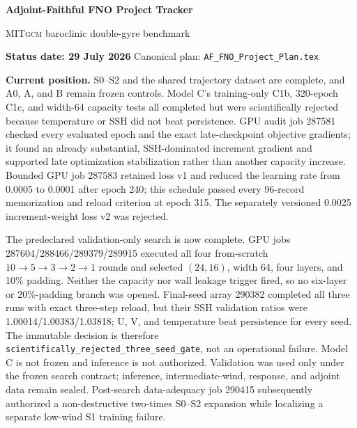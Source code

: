\documentclass[11pt]{article}
\newcommand{\MITgcm}{\textsc{MITgcm}}
\begin{document}
\begin{center}
  {\sffamily\bfseries\color{navy}\fontsize{24}{28}\selectfont
  Adjoint-Faithful FNO Project Tracker\par}
  \vspace{0.12in}
  {\large \MITgcm{} baroclinic double-gyre benchmark\par}
  \vspace{0.14in}
  {\color{graytext}\textbf{Status date: 29 July 2026} \quad
  Canonical plan: \texttt{AF\_FNO\_Project\_Plan.tex}}
\end{center}

\begingroup\color{graytext}
\textbf{Current position.}  S0--S2 and the shared trajectory dataset are complete,
and A0, A, and B remain frozen controls.  Model C's training-only C1b, 320-epoch C1c,
and width-64 capacity tests all completed but were scientifically rejected because
temperature or SSH did not beat persistence.  GPU audit job 287581 checked every
evaluated epoch and the exact late-checkpoint objective gradients; it found an already
substantial, SSH-dominated increment gradient and supported late optimization
stabilization rather than another capacity increase.  Bounded GPU job 287583 retained
loss v1 and reduced the learning rate from 0.0005 to 0.0001 after epoch 240; this
schedule passed every 96-record memorization and reload criterion at epoch 315.
The separately versioned 0.0025 increment-weight loss v2 was rejected.

The predeclared validation-only search is now complete.  GPU jobs
287604/288466/289379/289915 executed all four from-scratch
\(10\rightarrow5\rightarrow3\rightarrow2\rightarrow1\) rounds and selected
\((24,16)\), width 64, four layers, and 10\% padding.  Neither the capacity nor wall
leakage trigger fired, so no six-layer or 20\%-padding branch was opened.  Final-seed
array 290382 completed all three runs with exact three-step reload, but their SSH
validation ratios were 1.00014/1.00383/1.03818; U, V, and temperature beat persistence
for every seed.  The immutable decision is therefore
\texttt{scientifically\_rejected\_three\_seed\_gate}, not an operational failure.
Model C is not frozen and inference is not authorized.  Validation was used only under
the frozen search contract; inference, intermediate-wind, response, and adjoint data
remain sealed.  Post-search data-adequacy job 290415 subsequently authorized a
non-destructive two-times S0--S2 expansion while localizing a separate low-wind S1
training failure.
\end{document}
